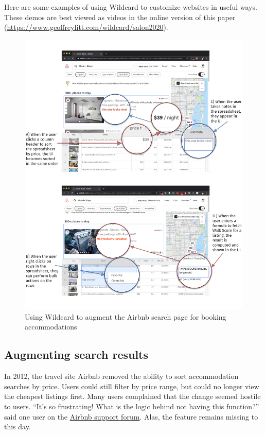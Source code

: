 \documentclass[english,submission]{programming}
\begin{document}
Here are some examples of using Wildcard to customize websites in useful
ways.{ These demos are best viewed as videos in the online version of
this paper (\url{https://www.geoffreylitt.com/wildcard/salon2020}).}

\begin{figure}
\hypertarget{fig:airbnb-demo}{%
\centering
\includegraphics{media/airbnb-demo-300dpi.png}
\caption{Using Wildcard to augment the Airbnb search page for booking
accommodations}\label{fig:airbnb-demo}
}
\end{figure}

\hypertarget{augmenting-search-results}{%
\subsection{Augmenting search results}\label{augmenting-search-results}}

In 2012, the travel site Airbnb removed the ability to sort
accommodation searches by price. Users could still filter by price
range, but could no longer view the cheapest listings first. Many users
complained that the change seemed hostile to users. ``It's so
frustrating! What is the logic behind not having this function?'' said
one user on the
\href{https://community.withairbnb.com/t5/Hosting/Sorting-listing-by-price/td-p/559404}{Airbnb
support forum}. Alas, the feature remains missing to this day.
\end{document}
